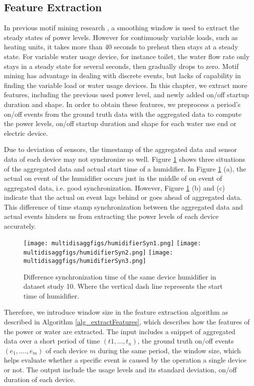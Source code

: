 \subsection{Feature Extraction}
In previous motif mining research \cite{shao2013temporal}, 
a smoothing window is used to extract the steady states of power levels.
However for continuously variable loads, such as heating units, 
it takes more than 40 seconds to preheat then stays at 
a steady state.  
For variable water usage device, for instance toilet, 
the water flow rate only stays in a steady state for several seconds, 
then gradually drops to zero. 
Motif mining has advantage in dealing with discrete events, but 
lacks of capability in finding the variable load or water usage devices. 
In this chapter, we extract more features, including the previous used 
power level, and newly added on/off startup duration and shape. 
In order to obtain these features, 
we preprocess a period's on/off events from the ground truth data with the aggregated data 
to compute the power levels, on/off startup duration and shape for 
each water use end or electric device.
 
Due to deviation of sensors, the timestamp of the aggregated data and
sensor data of each device may not synchronize so well. 
Figure \ref{fig_humidifierSyn} shows three situations of
the aggregated data and actual start time of a humidifier. 
In Figure \ref{fig_humidifierSyn} (a), 
the actual on event of the humidifier occurs just in the middle of on
event of aggregated data, i.e. good synchronization.
However, Figure \ref{fig_humidifierSyn} (b) and (c) indicate that the
actual on event lags behind or goes ahead of aggregated data. 
This difference of time stamp synchronization between 
the aggregated data and actual events 
hinders us from extracting the power levels of each device accurately.
\begin{figure}[!t]
\centering
\texttt{[image: multidisaggfigs/humidifierSyn1.png]}
\texttt{[image: multidisaggfigs/humidifierSyn2.png]}
\texttt{[image: multidisaggfigs/humidifierSyn3.png]}
\caption{Difference synchronization time of the same device humidifier in dataset study 10. Where the vertical dash line represents the start time of humidifier.}
\label{fig_humidifierSyn}
\end{figure}

Therefore, we introduce window size in the feature extraction algorithm as described 
in Algorithm \ref{alg_extractFeatures}, which describes how the features of 
the power or water are extracted.
The input includes a snippet of aggregated data over a short period of time $(t1,..., t_n)$, the ground truth on/off events $(e_1, ...., e_m)$ of each device $m$ during the same period, 
the window size, which helps evaluate whether a specific event is 
caused by the operation a single device or not. 
The output include the usage levels and its standard deviation, 
on/off duration of each device. 

